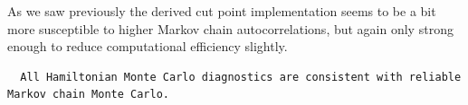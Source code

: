 \documentclass[
  letterpaper,
  DIV=11,
  numbers=noendperiod]{scrartcl}
\newenvironment{Shaded}{\begin{snugshade}}{\end{snugshade}}
\newcommand{\AttributeTok}[1]{\textcolor[rgb]{0.40,0.45,0.13}{#1}}
\newcommand{\ConstantTok}[1]{\textcolor[rgb]{0.56,0.35,0.01}{#1}}
\newcommand{\FunctionTok}[1]{\textcolor[rgb]{0.28,0.35,0.67}{#1}}
\newcommand{\NormalTok}[1]{\textcolor[rgb]{0.00,0.23,0.31}{#1}}
\newcommand{\OtherTok}[1]{\textcolor[rgb]{0.00,0.23,0.31}{#1}}
\newcommand{\SpecialCharTok}[1]{\textcolor[rgb]{0.37,0.37,0.37}{#1}}
\newcommand{\StringTok}[1]{\textcolor[rgb]{0.13,0.47,0.30}{#1}}
\begin{document}
As we saw previously the derived cut point implementation seems to be a
bit more susceptible to higher Markov chain autocorrelations, but again
only strong enough to reduce computational efficiency slightly.

\begin{Shaded}
\end{Shaded}

\begin{verbatim}
  All Hamiltonian Monte Carlo diagnostics are consistent with reliable
Markov chain Monte Carlo.
\end{verbatim}

\begin{Shaded}
\end{Shaded}
\end{document}
